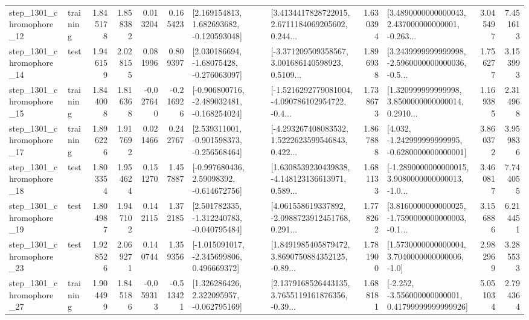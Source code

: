 \begin{tabular}{llrrrrllrlrr}
 step\_1301\_chromophore\_12 &  training &      1.845178 &    1.858382 &      0.013204 &  0.165423 &    [2.169154813, 1.682693682, -0.120593048] &  [3.4134417828722015, 2.6711184069205602, 0.244... &       1.630394 &  [3.4890000000000043, 2.437000000000001, -0.263... &            3.045497 &          7.451613 \\
 step\_1301\_chromophore\_14 &      test &      1.946159 &    2.028155 &      0.081996 &  0.809397 &    [2.030186694, -1.68075428, -0.276063097] &  [-3.371209509358567, 3.001686140598923, 0.5109... &       1.896938 &  [3.2439999999999998, -2.5960000000000036, -0.5... &            1.756277 &          3.153993 \\
 step\_1301\_chromophore\_15 &  training &      1.844008 &    1.816368 &     -0.027640 & -0.216926 &  [-0.906800716, -2.489032481, -0.168254024] &  [-1.5216292779081004, -4.090786102954722, -0.4... &       1.738673 &  [1.320999999999998, 3.8500000000000014, 0.2910... &            1.169385 &          2.314968 \\
 step\_1301\_chromophore\_17 &  training &      1.896226 &    1.917692 &      0.021466 &  0.242767 &   [2.539311001, -0.901598373, -0.256568464] &  [-4.293267408083532, 1.5222623599546843, 0.422... &       1.867888 &   [4.032, -1.242999999999995, -0.6280000000000001] &            3.860372 &          3.959836 \\
 step\_1301\_chromophore\_18 &      test &      1.803354 &    1.954624 &      0.151270 &  1.457887 &    [-0.997680436, 2.59098392, -0.614672756] &  [1.6308539230439838, -4.148123136613971, 0.589... &       1.681133 &  [-1.2890000000000015, 3.9080000000000013, -1.0... &            3.460817 &          7.744055 \\
 step\_1301\_chromophore\_19 &      test &      1.804987 &    1.947102 &      0.142115 &  1.372185 &   [2.501782335, -1.312240783, -0.040795484] &  [4.061558619337892, -2.0988723912451768, 0.291... &       1.778262 &  [3.8160000000000025, -1.7590000000000003, -0.1... &            3.156886 &          6.214451 \\
 step\_1301\_chromophore\_23 &      test &      1.928526 &    2.069271 &      0.140744 &  1.359356 &   [-1.015091017, -2.345699806, 0.496669372] &  [1.8491985405879472, 3.8690750884352125, -0.89... &       1.781900 &     [1.5730000000000004, 3.7040000000000006, -1.0] &            2.982969 &          3.285533 \\
 step\_1301\_chromophore\_27 &  training &      1.904499 &    1.845186 &     -0.059313 & -0.513421 &    [1.326286426, 2.322095957, -0.062795169] &  [2.1379168526443135, 3.7655119161876356, -0.39... &       1.688181 &  [-2.252, -3.556000000000001, 0.41799999999999926] &            5.051034 &          2.794364 \\

\end{tabular}
